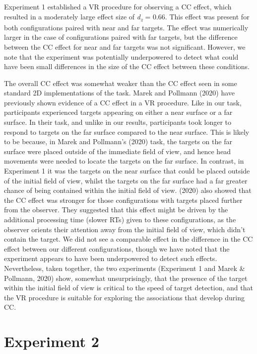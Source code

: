 \documentclass[
  english,
  man,floatsintext]{apa7}
\begin{document}
Experiment 1 established a VR procedure for observing a CC effect, which resulted in a moderately large effect size of \emph{d\textsubscript{z}} = 0.66. This effect was present for both configurations paired with near and far targets. The effect was numerically larger in the case of configurations paired with far targets, but the difference between the CC effect for near and far targets was not significant. However, we note that the experiment was potentially underpowered to detect what could have been small differences in the size of the CC effect between these conditions.

The overall CC effect was somewhat weaker than the CC effect seen in some standard 2D implementations of the task. Marek and Pollmann (2020) have previously shown evidence of a CC effect in a VR procedure. Like in our task, participants experienced targets appearing on either a near surface or a far surface. In their task, and unlike in our results, participants took longer to respond to targets on the far surface compared to the near surface. This is likely to be because, in Marek and Pollmann's (2020) task, the targets on the far surface were placed outside of the immediate field of view, and hence head movements were needed to locate the targets on the far surface. In contrast, in Experiment 1 it was the targets on the near surface that could be placed outside of the initial field of view, whilst the targets on the far surface had a far greater chance of being contained within the initial field of view. (2020) also showed that the CC effect was stronger for those configurations with targets placed further from the observer. They suggested that this effect might be driven by the additional processing time (slower RTs) given to these configurations, as the observer orients their attention away from the initial field of view, which didn't contain the target. We did not see a comparable effect in the difference in the CC effect between our different configurations, though we have noted that the experiment appears to have been underpowered to detect such effects. Nevertheless, taken together, the two experiments (Experiment 1 and Marek \& Pollmann, 2020) show, somewhat unsurprisingly, that the presence of the target within the initial field of view is critical to the speed of target detection, and that the VR procedure is suitable for exploring the associations that develop during CC.

\hypertarget{experiment-2}{%
\section{Experiment 2}\label{experiment-2}}
\end{document}

